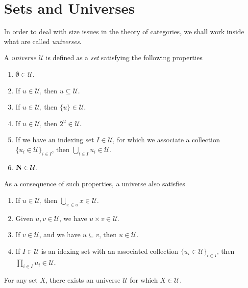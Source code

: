 \section{Sets and Universes}

In order to deal with size issues in the theory of categories, we shall work
inside what are called \emph{universes}.

\begin{definition}[Universe]
\label{def:universe}
A \emph{universe} \(\mathcal U\) is defined as a \emph{set} satisfying the
following properties
\begin{enumerate}[(U1)]\setlength\itemsep{0em}
\item \(\emptyset \in \mathcal U\).
\item If \(u \in \mathcal U\), then \(u \subseteq \mathcal U\).
\item If \(u \in \mathcal U\), then \(\{u\} \in \mathcal U\).
\item If \(u \in \mathcal U\), then \(2^u \in \mathcal U\).
\item If we have an indexing set \(I \in \mathcal U\), for which we associate
  a collection \(\{u_i \in \mathcal U\}_{i \in I}\), then \(\bigcup_{i \in I} u_i
  \in \mathcal U\).
\item \(\mathbf{N} \in \mathcal U\).
\end{enumerate}
As a consequence of such properties, a universe also satisfies
\begin{enumerate}[(U1)]\setlength\itemsep{0em}
\setcounter{enumi}{6}
\item If \(u \in \mathcal U\), then \(\bigcup_{x \in u} x \in \mathcal U\).
\item Given \(u, v \in \mathcal U\), we have \(u \times v \in \mathcal U\).
\item If \(v \in \mathcal U\), and we have \(u \subseteq v\), then \(u \in
  \mathcal U\).
\item If \(I \in \mathcal U\) is an idexing set with an associated collection
  \(\{u_{i} \in \mathcal U\}_{i \in I}\), then \(\prod_{i \in I} u_i \in
  \mathcal U\).
\end{enumerate}
\end{definition}

\begin{axiom}
\label{def:Grothendieck-axiom-ZF-set-theory}
For any set \(X\), there exists an universe \(\mathcal U\) for which \(X \in
\mathcal U\).
\end{axiom}

